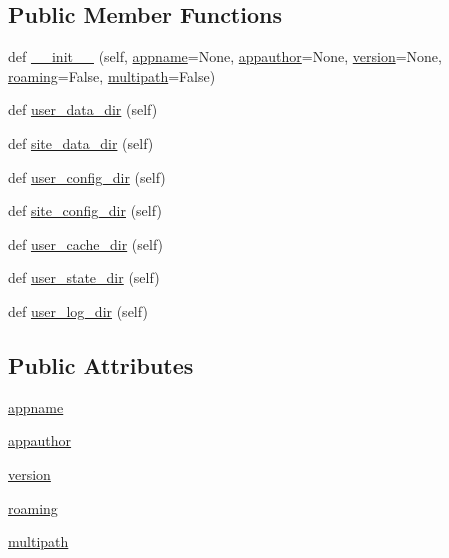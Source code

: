 \subsection*{Public Member Functions}
\begin{DoxyCompactItemize}
\item 
def \hyperlink{classpip_1_1__vendor_1_1appdirs_1_1AppDirs_a7244e7e597776fae81fb93380e5f02f5}{\+\_\+\+\_\+init\+\_\+\+\_\+} (self, \hyperlink{classpip_1_1__vendor_1_1appdirs_1_1AppDirs_a1f68589425ae8dc5e12cf37dcd12a12c}{appname}=None, \hyperlink{classpip_1_1__vendor_1_1appdirs_1_1AppDirs_a7ce23aa82b9c9e1fd6fd6c034cb7e3c5}{appauthor}=None, \hyperlink{classpip_1_1__vendor_1_1appdirs_1_1AppDirs_a53acc2f55f1d866332cc96cc17809c7a}{version}=None, \hyperlink{classpip_1_1__vendor_1_1appdirs_1_1AppDirs_a5c01b0bb6c8df8092454c523a28cd265}{roaming}=False, \hyperlink{classpip_1_1__vendor_1_1appdirs_1_1AppDirs_a650d66c20b9b7169efc78d6492097124}{multipath}=False)
\item 
def \hyperlink{classpip_1_1__vendor_1_1appdirs_1_1AppDirs_a7f447db02cb3c7928a274c747dc3e980}{user\+\_\+data\+\_\+dir} (self)
\item 
def \hyperlink{classpip_1_1__vendor_1_1appdirs_1_1AppDirs_a228b7a1e3c0131fb42b6c270deb4f9df}{site\+\_\+data\+\_\+dir} (self)
\item 
def \hyperlink{classpip_1_1__vendor_1_1appdirs_1_1AppDirs_a986e24486a683d00b8fa749d947b4682}{user\+\_\+config\+\_\+dir} (self)
\item 
def \hyperlink{classpip_1_1__vendor_1_1appdirs_1_1AppDirs_a86d988d4209bb630427e87f11631136b}{site\+\_\+config\+\_\+dir} (self)
\item 
def \hyperlink{classpip_1_1__vendor_1_1appdirs_1_1AppDirs_a5c37259df247dad522ee7681e49c8c5b}{user\+\_\+cache\+\_\+dir} (self)
\item 
def \hyperlink{classpip_1_1__vendor_1_1appdirs_1_1AppDirs_af9b236cb9b1fc7b6b2be7257a3ef5131}{user\+\_\+state\+\_\+dir} (self)
\item 
def \hyperlink{classpip_1_1__vendor_1_1appdirs_1_1AppDirs_a393a7659050a995a3bc659670c7c269b}{user\+\_\+log\+\_\+dir} (self)
\end{DoxyCompactItemize}
\subsection*{Public Attributes}
\begin{DoxyCompactItemize}
\item 
\hyperlink{classpip_1_1__vendor_1_1appdirs_1_1AppDirs_a1f68589425ae8dc5e12cf37dcd12a12c}{appname}
\item 
\hyperlink{classpip_1_1__vendor_1_1appdirs_1_1AppDirs_a7ce23aa82b9c9e1fd6fd6c034cb7e3c5}{appauthor}
\item 
\hyperlink{classpip_1_1__vendor_1_1appdirs_1_1AppDirs_a53acc2f55f1d866332cc96cc17809c7a}{version}
\item 
\hyperlink{classpip_1_1__vendor_1_1appdirs_1_1AppDirs_a5c01b0bb6c8df8092454c523a28cd265}{roaming}
\item 
\hyperlink{classpip_1_1__vendor_1_1appdirs_1_1AppDirs_a650d66c20b9b7169efc78d6492097124}{multipath}
\end{DoxyCompactItemize}


